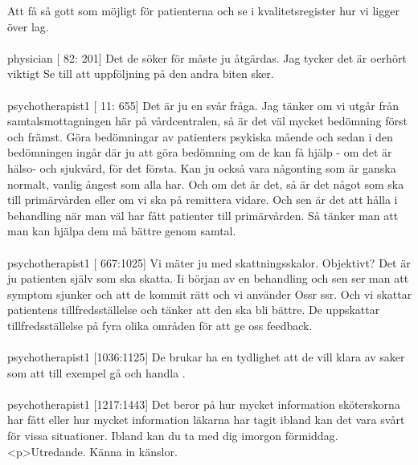 \documentclass[12pt,a4paper,oneside]{article}
\begin{document}
Att f{\aa} s{\aa} gott som m{\"o}jligt f{\"o}r patienterna och se i kvalitetsregister hur vi ligger {\"o}ver lag. %
\\\ \\
 physician [  82: 201] 
Det de s{\"o}ker f{\"o}r m{\aa}ste ju {\aa}tg{\"a}rdas. Jag tycker det {\"a}r oerh{\"o}rt viktigt Se till att uppf{\"o}ljning p{\aa} den andra biten sker.  %
\\\ \\
 psychotherapist1 [  11: 655] 
Det {\"a}r ju en sv{\aa}r fr{\aa}ga. Jag t{\"a}nker om vi utg{\aa}r fr{\aa}n samtalsmottagningen h{\"a}r p{\aa} v{\aa}rdcentralen, s{\aa} {\"a}r det v{\"a}l mycket bed{\"o}mning f{\"o}rst och fr{\"a}mst. G{\"o}ra bed{\"o}mningar av patienters psykiska m{\aa}ende och sedan i den bed{\"o}mningen ing{\aa}r d{\"a}r ju att g{\"o}ra bed{\"o}mning om de kan f{\aa} hj{\"a}lp - om det {\"a}r h{\"a}lso- och sjukv{\aa}rd, f{\"o}r det f{\"o}rsta. Kan ju ocks{\aa} vara n{\aa}gonting som {\"a}r ganska normalt, vanlig {\aa}ngest som alla har. Och om det {\"a}r det, s{\aa} {\"a}r det n{\aa}got som ska till prim{\"a}rv{\aa}rden eller om vi ska p{\aa} remittera vidare. Och sen {\"a}r det att h{\aa}lla i behandling n{\"a}r man v{\"a}l har f{\aa}tt patienter till prim{\"a}rv{\aa}rden. S{\aa} t{\"a}nker man att man kan hj{\"a}lpa dem m{\aa} b{\"a}ttre genom samtal. %
\\\ \\
 psychotherapist1 [ 667:1025] 
Vi m{\"a}ter ju med skattningsskalor. Objektivt? Det {\"a}r ju patienten sj{\"a}lv som ska skatta. Ii b{\"o}rjan av en behandling och sen ser man att symptom sjunker och att de kommit r{\"a}tt och vi anv{\"a}nder Ossr ssr. Och vi skattar patientens tillfredsst{\"a}llelse och t{\"a}nker att den ska bli b{\"a}ttre. De uppskattar tillfredsst{\"a}llelse p{\aa} fyra olika omr{\aa}den f{\"o}r att ge oss feedback. %
\\\ \\
 psychotherapist1 [1036:1125] 
De brukar ha en tydlighet att de vill klara av saker som att till exempel g{\aa} och handla . %
\\\ \\
 psychotherapist1 [1217:1443] 
Det beror p{\aa} hur mycket information sk{\"o}terskorna har f{\aa}tt eller hur mycket information l{\"a}karna har tagit ibland kan det vara sv{\aa}rt f{\"o}r vissa situationer. Ibland kan du ta med dig imorgon f{\"o}rmiddag.<p>Utredande. K{\"a}nna in k{\"a}nslor. %
\end{document}

